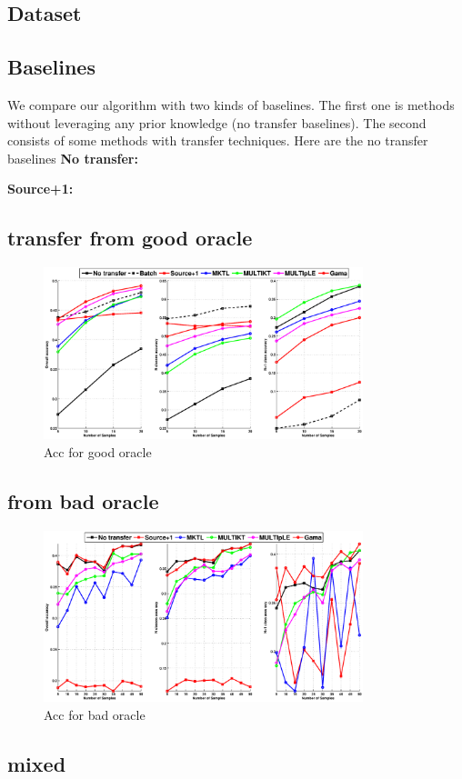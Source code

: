 \subsection{Dataset}

\subsection{Baselines}
We compare our algorithm with two kinds of baselines. The first one is methods without leveraging any prior knowledge (no transfer baselines). The second consists of some methods with transfer techniques. Here are the no transfer baselines 
\textbf{No transfer:} 

\textbf{Source+1:}

\subsection{transfer from good oracle}
\begin{figure}
\includegraphics[width=\textwidth,height=5cm]{fig/C2C_RBF.eps}
\caption{Acc for good oracle}
\end{figure}

\subsection{from bad oracle}
\begin{figure}
\includegraphics[width=\textwidth,height=5cm]{fig/A2C_RBF_PHOG.eps}
\caption{Acc for bad oracle}
\end{figure}

\subsection{mixed}

